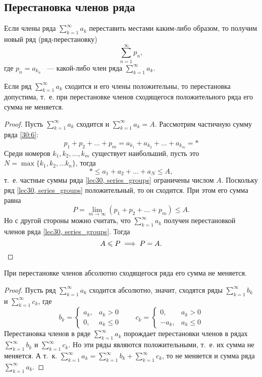 \documentclass[../../main.tex]{subfiles}
\begin{document}
\subsection{Перестановка членов ряда}
Если члены ряда $\sum\limits_{k = 1}^{\infty} a_k$
переставить местами каким-либо образом, то получим новый ряд (ряд-перестановку)
\begin{equation}
\label{30:6}
\sum\limits_{n = 1}^{\infty} p_n,
\end{equation}
где $p_n = a_{k_n}$ ~--- какой-либо член ряда $\sum\limits_{k = 1}^{\infty} a_k$.
\begin{thm}
	Если ряд $\sum\limits_{k = 1}^{\infty} a_k$ сходится и его члены положительны,
	то перестановка допустима, т.~е. при перестановке членов сходящегося
	положительного ряда его сумма не меняется.
\end{thm}
\begin{proof}
	Пусть $\sum\limits_{k = 1}^{\infty} a_k$  сходится и
	$\sum\limits_{k = 1}^{\infty} a_k = A$. Рассмотрим
	частичную сумму ряда \eqref{30:6}:
	\[p_1 + p_2 + \ldots + p_m = a_{k_1} + a_{k_2} + \ldots + a_{k_m} = *\]
	Среди номеров $k_1, k_2, \ldots, k_m$ существует 
	наибольший, пусть это
	$N = \max\{k_1, k_2, \ldots k_n\}$, тогда \[* \leq a_1 + a_2 + \ldots +
	a_N \leq A,\] т.~е. частные суммы ряда \eqref{lec30, series_groups}
	ограничены числом $A$. Поскольку ряд \eqref{lec30, series_groups}
	положительный, то он сходится. При этом его сумма равна
	\[P = \lim\limits_{m \to \infty}(p_1 + p_2 + \ldots + p_m) \leq A.\]
	Но с другой стороны можно считать, что $\sum\limits_{k = 1}^{\infty} a_k$
	получен перестановкой членов ряда \eqref{lec30, series_groups}. Тогда
	\[A \leq P \implies P = A. \qedhere\]
\end{proof}
\begin{crl*}
	При перестановке членов абсолютно сходящегося ряда его сумма не меняется.
\end{crl*}
\begin{proof}
		Пусть ряд $\sum\limits_{k = 1}^{\infty} a_k$ сходится абсолютно,
		значит, сходятся ряды $\sum\limits_{k = 1}^{\infty} b_k$ и
		$\sum\limits_{k = 1}^{\infty} c_k$, где\[b_k = \begin{cases}
			a_k,& a_k > 0\\
			0,& a_k \le 0
		  \end{cases} \qquad
		 c_k = \begin{cases}
			0,& a_k > 0\\
			-a_k,& a_k \le 0
		  \end{cases}\]
  Перестановка членов в ряде $\sum\limits_{k = 1}^{\infty} a_k$ порождает перестановки членов
  в рядах  $\sum\limits_{k = 1}^{\infty} b_k$ и
  $\sum\limits_{k = 1}^{\infty} c_k$. Но эти ряды являются положительными,
  т.~е. их сумма не меняется. А т.~к. $\sum\limits_{k = 1}^{\infty} a_k
   = \sum\limits_{k = 1}^{\infty} b_k + \sum\limits_{k = 1}^{\infty} c_k$,
   то не меняется и сумма ряда $\sum\limits_{k = 1}^{\infty} a_k$.
\end{proof}
\end{document}
